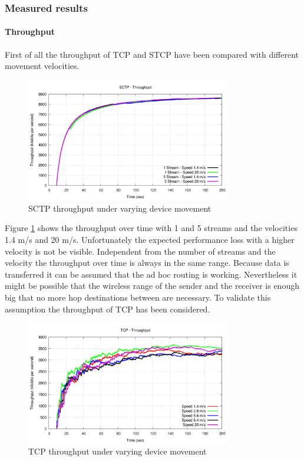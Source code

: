 \documentclass[a4paper]{article}
\begin{document}
\subsubsection{Measured results}

\paragraph{Throughput}

First of all the throughput of TCP and STCP have been compared with different movement velocities. 

\begin{figure}[H]
	\centering
	\includegraphics[width=0.8\textwidth]{imgs/sctp-throughput.png}
	\caption{SCTP throughput under varying device movement}
	\label{fig:sctp-throughput}
\end{figure}

Figure \ref{fig:sctp-throughput} shows the throughput over time with 1 and 5 streams and the velocities 1.4 m/s and 20 m/s. Unfortunately the expected performance loss with a higher velocity is not be visible. Independent from the number of streams and the velocity the throughput over time is always in the same range. Because data is transferred it can be assumed that the ad hoc routing is working. Nevertheless it might be possible that the wireless range of the sender and the receiver is enough big that no more hop destinations between are necessary. To validate this assumption the throughput of TCP has been considered.

\begin{figure}[H]
	\centering
	\includegraphics[width=0.8\textwidth]{imgs/tcp-throughput.png}
	\caption{TCP throughput under varying device movement}
	\label{fig:tcp-throughput}
\end{figure}
\end{document}
